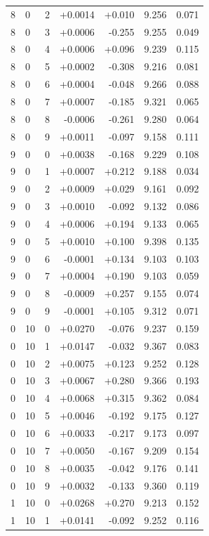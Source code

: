 \documentclass[10pt]{article}
\begin{document}
\begin{longtable}{llrrrrr}
8 & 0 & 2 & +0.0014 & +0.010 & 9.256 & 0.071 \\
8 & 0 & 3 & +0.0006 & -0.255 & 9.255 & 0.049 \\
8 & 0 & 4 & +0.0006 & +0.096 & 9.239 & 0.115 \\
8 & 0 & 5 & +0.0002 & -0.308 & 9.216 & 0.081 \\
8 & 0 & 6 & +0.0004 & -0.048 & 9.266 & 0.088 \\
8 & 0 & 7 & +0.0007 & -0.185 & 9.321 & 0.065 \\
8 & 0 & 8 & -0.0006 & -0.261 & 9.280 & 0.064 \\
8 & 0 & 9 & +0.0011 & -0.097 & 9.158 & 0.111 \\
9 & 0 & 0 & +0.0038 & -0.168 & 9.229 & 0.108 \\
9 & 0 & 1 & +0.0007 & +0.212 & 9.188 & 0.034 \\
9 & 0 & 2 & +0.0009 & +0.029 & 9.161 & 0.092 \\
9 & 0 & 3 & +0.0010 & -0.092 & 9.132 & 0.086 \\
9 & 0 & 4 & +0.0006 & +0.194 & 9.133 & 0.065 \\
9 & 0 & 5 & +0.0010 & +0.100 & 9.398 & 0.135 \\
9 & 0 & 6 & -0.0001 & +0.134 & 9.103 & 0.103 \\
9 & 0 & 7 & +0.0004 & +0.190 & 9.103 & 0.059 \\
9 & 0 & 8 & -0.0009 & +0.257 & 9.155 & 0.074 \\
9 & 0 & 9 & -0.0001 & +0.105 & 9.312 & 0.071 \\
0 & 10 & 0 & +0.0270 & -0.076 & 9.237 & 0.159 \\
0 & 10 & 1 & +0.0147 & -0.032 & 9.367 & 0.083 \\
0 & 10 & 2 & +0.0075 & +0.123 & 9.252 & 0.128 \\
0 & 10 & 3 & +0.0067 & +0.280 & 9.366 & 0.193 \\
0 & 10 & 4 & +0.0068 & +0.315 & 9.362 & 0.084 \\
0 & 10 & 5 & +0.0046 & -0.192 & 9.175 & 0.127 \\
0 & 10 & 6 & +0.0033 & -0.217 & 9.173 & 0.097 \\
0 & 10 & 7 & +0.0050 & -0.167 & 9.209 & 0.154 \\
0 & 10 & 8 & +0.0035 & -0.042 & 9.176 & 0.141 \\
0 & 10 & 9 & +0.0032 & -0.133 & 9.360 & 0.119 \\
1 & 10 & 0 & +0.0268 & +0.270 & 9.213 & 0.152 \\
1 & 10 & 1 & +0.0141 & -0.092 & 9.252 & 0.116 \\

\end{longtable}
\end{document}
